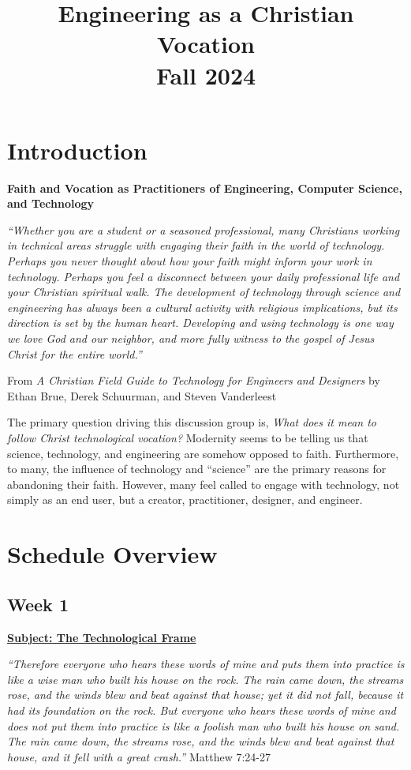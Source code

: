 \documentclass[11pt]{article}
\date{}
\title{Engineering as a Christian Vocation\\\medskip
\large Fall 2024}
\let\oldsection\section
\renewcommand\section{\clearpage\oldsection}
\begin{document}
\maketitle
\section*{Introduction}
\label{sec:org9726109}
\begin{center}
\textbf{Faith and Vocation as Practitioners of Engineering, Computer Science, and
 Technology}
\end{center}

\emph{``Whether you are a student or a seasoned professional, many Christians working
in technical areas struggle with engaging their faith in the world of
technology. Perhaps you never thought about how your faith might inform your
work in technology. Perhaps you feel a disconnect between your daily
professional life and your Christian spiritual walk. The development of
technology through science and engineering has always been a cultural activity
with religious implications, but its direction is set by the human heart.
Developing and using technology is one way we love God and our neighbor, and
more fully witness to the gospel of Jesus Christ for the entire world.''}
\begin{flushright}
From \emph{A Christian Field Guide to Technology for Engineers and Designers} by
Ethan Brue, Derek Schuurman, and Steven Vanderleest
\end{flushright}

The primary question driving this discussion group is, \emph{What does it mean to
follow Christ technological vocation?} Modernity seems to be telling us that
science, technology, and engineering are somehow opposed to faith. Furthermore,
to many, the influence of technology and ``science'' are the primary reasons for
abandoning their faith. However, many feel called to engage with technology, not
simply as an end user, but a creator, practitioner, designer, and engineer.
\section*{Schedule Overview}
\label{sec:org3c98e07}
\subsection*{Week 1}
\label{sec:orgd1e5185}
\textbf{\uline{Subject: The Technological Frame}}
\begin{mdframed}[nobreak=true]
\emph{“Therefore everyone who hears these words of mine and puts them into practice
is like a wise man who built his house on the rock. The rain came down, the
streams rose, and the winds blew and beat against that house; yet it did not
fall, because it had its foundation on the rock. But everyone who hears these
words of mine and does not put them into practice is like a foolish man who
built his house on sand. The rain came down, the streams rose, and the winds
blew and beat against that house, and it fell with a great crash.”} Matthew
7:24-27
\end{mdframed}
\end{document}
